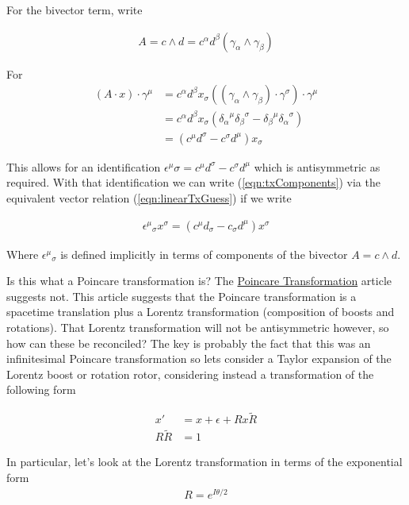 \documentclass{article}
\begin{document}
For the bivector term, write

\begin{align*}
A = c \wedge d = c^\alpha d^\beta (\gamma_\alpha \wedge \gamma_\beta)
\end{align*}

For
\begin{align*}
(A \cdot x ) \cdot \gamma^\mu 
&=
c^\alpha d^\beta x_\sigma ((\gamma_\alpha \wedge \gamma_\beta) \cdot \gamma^\sigma) \cdot \gamma^\mu \\
&=
c^\alpha d^\beta x_\sigma ( {\delta_\alpha}^\mu {\delta_\beta}^\sigma -{\delta_\beta}^\mu {\delta_\alpha}^\sigma ) \\
&=
(c^\mu d^\sigma -c^\sigma d^\mu ) x_\sigma 
\end{align*}

This allows for an identification $\epsilon^\mu\sigma = c^\mu d^\sigma -c^\sigma d^\mu$ which is antisymmetric as required.
With that identification we can write (\ref{eqn:txComponents}) via the equivalent vector relation (\ref{eqn:linearTxGuess}) if
we write

\begin{align*}
{\epsilon^\mu}_\sigma x^\sigma = (c^\mu d_\sigma -c_\sigma d^\mu ) x^\sigma 
\end{align*}

Where ${\epsilon^\mu}_\sigma$ is defined implicitly in terms of components of the bivector $A = c \wedge d$.

Is this what a Poincare transformation is?  The \href{http://mathworld.wolfram.com/PoincareTransformation.html}{Poincare Transformation} article suggests not.  This article suggests that the Poincare transformation is a spacetime translation plus
a Lorentz transformation (composition of boosts and rotations).  That Lorentz transformation will not be antisymmetric
however, so how can these be reconciled?  The key is probably the fact that this was an infinitesimal Poincare transformation
so lets consider a Taylor expansion of the Lorentz boost or rotation rotor, considering instead a transformation of the 
following form

\begin{align}\label{eqn:spaceTimeTxAndLor}
x' &= x + \epsilon + R x \tilde{R} \\
R \tilde{R} &= 1
\end{align}

In particular, let's look at the Lorentz transformation in terms of the exponential form
\begin{align*}
R = e^{I \theta/2}
\end{align*}
\end{document}
